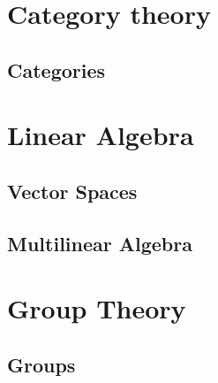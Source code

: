 \part{Category theory}

\chapter{Categories}






\part{Linear Algebra}

\chapter{Vector Spaces}










\chapter{Multilinear Algebra}







\part{Group Theory}

\chapter{Groups}


